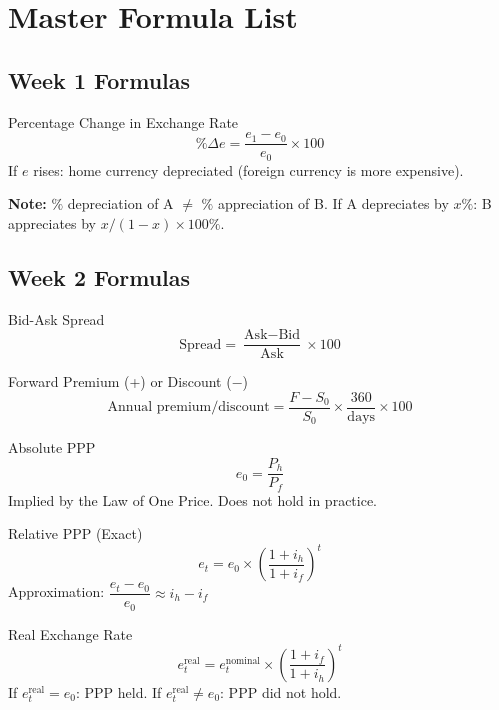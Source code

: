 \documentclass[11pt,a4paper]{article}
\begin{document}
\newpage

\section{Master Formula List}

\subsection*{Week 1 Formulas}

\begin{formulabox}{Percentage Change in Exchange Rate}
\[
  \%\Delta e = \frac{e_1 - e_0}{e_0} \times 100
\]
If $e$ rises: home currency depreciated (foreign currency is more expensive).

\textbf{Note:} $\%$ depreciation of A $\neq$ $\%$ appreciation of B.
If A depreciates by $x\%$: B appreciates by $x/(1-x) \times 100\%$.
\end{formulabox}

\subsection*{Week 2 Formulas}

\begin{formulabox}{Bid-Ask Spread}
\[
  \text{Spread} = \frac{\text{Ask} - \text{Bid}}{\text{Ask}} \times 100
\]
\end{formulabox}

\begin{formulabox}{Forward Premium (+) or Discount ($-$)}
\[
  \text{Annual premium/discount} = \frac{F - S_0}{S_0} \times \frac{360}{\text{days}} \times 100
\]
\end{formulabox}

\begin{formulabox}{Absolute PPP}
\[
  e_0 = \frac{P_h}{P_f}
\]
Implied by the Law of One Price. Does not hold in practice.
\end{formulabox}

\begin{formulabox}{Relative PPP (Exact)}
\[
  e_t = e_0 \times \left(\frac{1 + i_h}{1 + i_f}\right)^t
\]
Approximation: $\dfrac{e_t - e_0}{e_0} \approx i_h - i_f$
\end{formulabox}

\begin{formulabox}{Real Exchange Rate}
\[
  e_t^{\text{real}} = e_t^{\text{nominal}} \times \left(\frac{1 + i_f}{1 + i_h}\right)^t
\]
If $e_t^{\text{real}} = e_0$: PPP held. If $e_t^{\text{real}} \neq e_0$: PPP did not hold.
\end{formulabox}
\end{document}
